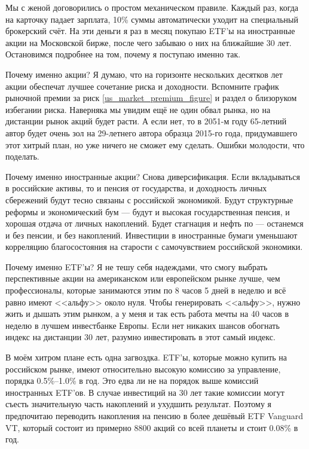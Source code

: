 Мы с женой договорились о простом механическом правиле. Каждый раз, когда на 
карточку падает зарплата, 10\% суммы автоматически уходит на специальный 
брокерский счёт. На эти деньги я раз в месяц покупаю ETF'ы на иностранные акции 
на Московской бирже, после чего забываю о них на ближайшие 30 лет. Остановимся 
подробнее на том, почему я поступаю именно так.
 
Почему именно акции? Я думаю, что на горизонте нескольких десятков лет акции 
обеспечат лучшее сочетание риска и доходности. Вспомните график рыночной премии 
за риск \ref{us_market_premium_figure} и раздел о близоруком избегании риска. 
Наверняка мы увидим ещё не один обвал рынка, но на дистанции рынок акций будет 
расти. А если нет, то в 2051\nobreakdash-м году 65\nobreakdash-летний автор 
будет очень зол на 29\nobreakdash-летнего автора образца 2015\nobreakdash-го 
года, придумавшего этот хитрый план, но уже ничего не сможет ему сделать. 
Ошибки молодости, что поделать.

Почему именно иностранные акции? Снова диверсификация. Если вкладываться в 
российские активы, то и пенсия от государства, и доходность личных сбережений 
будут тесно связаны с российской экономикой. Будут структурные реформы и 
экономический бум --- будут и высокая государственная пенсия, и хорошая отдача 
от личных накоплений. Будет стагнация и нефть по  --- останемся и 
без пенсии, и без накоплений. Инвестиции в иностранные бумаги уменьшают 
корреляцию благосостояния на старости с самочувствием российской экономики.

Почему именно ETF'ы? Я не тешу себя надеждами, что смогу выбрать перспективные 
акции на американском или европейском рынке лучше, чем профессионалы, которые 
занимаются этим по 8 часов 5 дней в неделю и всё равно имеют <<альфу>> около 
нуля. Чтобы генерировать <<альфу>>, нужно жить и дышать этим рынком, а у меня и 
так есть работа мечты на 40 часов в неделю в лучшем инвестбанке Европы. Если 
нет никаких шансов обогнать индекс на дистанции 30 лет, разумно инвестировать в 
этот самый индекс.

В моём хитром плане есть одна загвоздка. ETF'ы, которые можно купить на 
российском рынке, имеют относительно высокую комиссию за управление, порядка 
0.5\%--1.0\% в год. Это едва ли не на порядок выше комиссий иностранных ETF'ов. 
В случае инвестиций на 30 лет такие комиссии могут съесть значительную часть 
накоплений и ухудшить результат. Поэтому я предпочитаю переводить накопления на 
пенсию в более дешёвый ETF Vanguard VT, который состоит из примерно 8800 акций 
со всей планеты и стоит 0.08\% в год.

